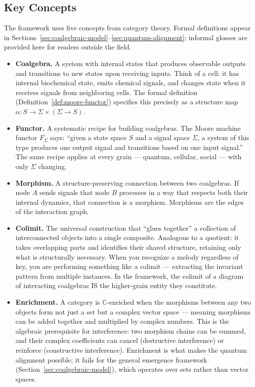 \documentclass[12pt,a4paper]{article}
\begin{document}
\subsection{Key Concepts}
\label{sec:key-concepts}

The framework uses five concepts from category theory. Formal definitions appear in Sections~\ref{sec:coalgebraic-model}--\ref{sec:quantum-alignment}; informal glosses are provided here for readers outside the field.

\begin{itemize}
  \item \textbf{Coalgebra.} A system with internal states that produces observable outputs and transitions to new states upon receiving inputs. Think of a cell: it has internal biochemical state, emits chemical signals, and changes state when it receives signals from neighboring cells. The formal definition (Definition~\ref{def:moore-functor}) specifies this precisely as a structure map $\alpha : S \to \Sigma \times (\Sigma \to S)$.

  \item \textbf{Functor.} A systematic recipe for building coalgebras. The Moore machine functor $F_\Sigma$ says: ``given a state space $S$ and a signal space $\Sigma$, a system of this type produces one output signal and transitions based on one input signal.'' The same recipe applies at every grain --- quantum, cellular, social --- with only $\Sigma$ changing.

  \item \textbf{Morphism.} A structure-preserving connection between two coalgebras. If node $A$ sends signals that node $B$ processes in a way that respects both their internal dynamics, that connection is a morphism. Morphisms are the edges of the interaction graph.

  \item \textbf{Colimit.} The universal construction that ``glues together'' a collection of interconnected objects into a single composite. Analogous to a quotient: it takes overlapping parts and identifies their shared structure, retaining only what is structurally necessary. When you recognize a melody regardless of key, you are performing something like a colimit --- extracting the invariant pattern from multiple instances. In the framework, the colimit of a diagram of interacting coalgebras IS the higher-grain entity they constitute.

  \item \textbf{Enrichment.} A category is $\mathbb{C}$-enriched when the morphisms between any two objects form not just a set but a complex vector space --- meaning morphisms can be added together and multiplied by complex numbers. This is the algebraic prerequisite for interference: two morphism chains can be summed, and their complex coefficients can cancel (destructive interference) or reinforce (constructive interference). Enrichment is what makes the quantum alignment possible; it fails for the general emergence framework (Section~\ref{sec:coalgebraic-model}), which operates over sets rather than vector spaces.
\end{itemize}
\end{document}
